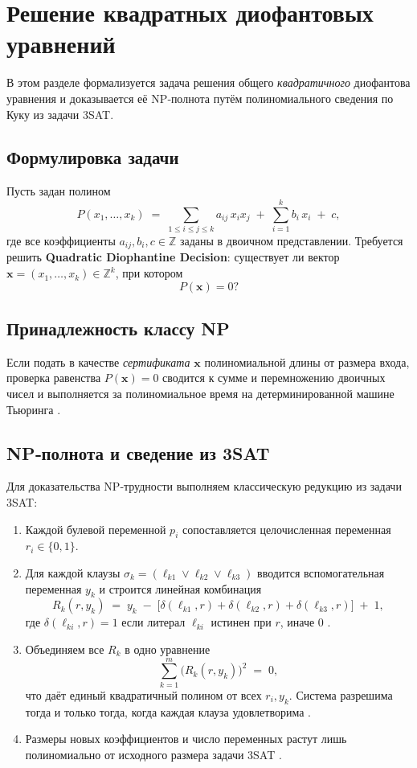 \documentclass[a4paper,12pt]{article}
\begin{document}
\newpage

\section{Решение квадратных диофантовых уравнений}

В этом разделе формализуется задача решения общего \emph{квадратичного} диофантова уравнения и доказывается её NP‑полнота путём полиномиального сведения по Куку из задачи 3SAT.

\subsection{Формулировка задачи}

Пусть задан полином
\[
P(x_1,\dots,x_k)
\;=\;\sum_{1\le i\le j\le k} a_{ij}\,x_i x_j
\;+\;\sum_{i=1}^k b_i\,x_i
\;+\;c,
\]
где все коэффициенты \(a_{ij},b_i,c\in\mathbb{Z}\) заданы в двоичном представлении.
Требуется решить
\textbf{Quadratic Diophantine Decision}:  существует ли вектор \(\mathbf x=(x_1,\dots,x_k)\in\mathbb{Z}^k\), при котором
\[
P(\mathbf x)=0?
\]

\subsection{Принадлежность классу NP}

Если подать в качестве \emph{сертификата} \(\mathbf x\) полиномиальной длины от размера входа, проверка равенства \(P(\mathbf x)=0\) сводится к сумме и перемножению двоичных чисел и выполняется за полиномиальное время на детерминированной машине Тьюринга \cite{MA78}\cite{SD79}\cite{MO09}.

\subsection{NP‑полнота и сведение из 3SAT}

Для доказательства NP‑трудности выполняем классическую редукцию из задачи \textsc{3SAT}:

\begin{enumerate}[1.]
  \item Каждой булевой переменной \(p_i\) сопоставляется целочисленная переменная \(r_i\in\{0,1\}\).
  \item Для каждой клаузы \(\sigma_k=(\ell_{k1}\lor\ell_{k2}\lor\ell_{k3})\) вводится вспомогательная переменная \(y_k\) и строится линейная комбинация
    \[
      R_k(r,y_k)
      \;=\;
      y_k \;-\;\bigl[\delta(\ell_{k1},r)+\delta(\ell_{k2},r)+\delta(\ell_{k3},r)\bigr]
      \;+\;1,
    \]
    где \(\delta(\ell_{ki},r)=1\) если литерал \(\ell_{ki}\) истинен при \(r\), иначе 0 \cite{MSE13}\cite{CST12}.
  \item Объединяем все \(R_k\) в одно уравнение
    \[
      \sum_{k=1}^m \bigl(R_k(r,y_k)\bigr)^2 \;=\;0,
    \]
    что даёт единый квадратичный полином от всех \(r_i,y_k\). Система разрешима тогда и только тогда, когда каждая клауза удовлетворима \cite{IUSPD18}\cite{MSE13}.
  \item Размеры новых коэффициентов и число переменных растут лишь полиномиально от исходного размера задачи 3SAT \cite{SD79}\cite{SPR78}.
\end{enumerate}
\end{document}
